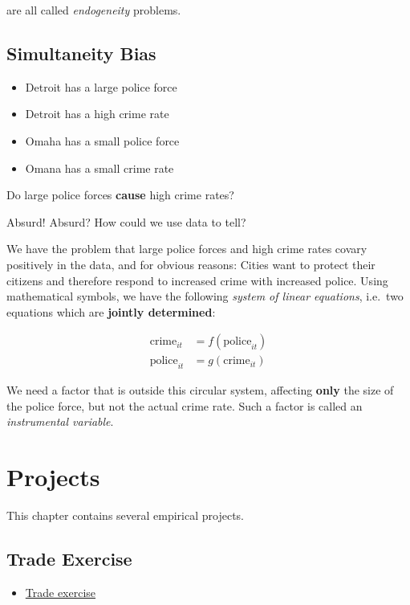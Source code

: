 \documentclass[]{book}
\providecommand{\tightlist}{%
  \setlength{\itemsep}{0pt}\setlength{\parskip}{0pt}}
\begin{document}
are all called \emph{endogeneity} problems.

\hypertarget{simultaneity-bias}{%
\section{Simultaneity Bias}\label{simultaneity-bias}}

\begin{itemize}
\tightlist
\item
  Detroit has a large police force
\item
  Detroit has a high crime rate
\item
  Omaha has a small police force
\item
  Omana has a small crime rate
\end{itemize}

Do large police forces \textbf{cause} high crime rates?

Absurd! Absurd? How could we use data to tell?

We have the problem that large police forces and high crime rates covary positively in the data, and for obvious reasons: Cities want to protect their citizens and therefore respond to increased crime with increased police. Using mathematical symbols, we have the following \emph{system of linear equations}, i.e.~two equations which are \textbf{jointly determined}:

\begin{align*}
\text{crime}_{it} &= f(\text{police}_{it}) \\
\text{police}_{it}&= g(\text{crime}_{it} )
\end{align*}

We need a factor that is outside this circular system, affecting \textbf{only} the size of the police force, but not the actual crime rate. Such a factor is called an \emph{instrumental variable}.

\hypertarget{projects}{%
\chapter{Projects}\label{projects}}

This chapter contains several empirical projects.

\hypertarget{trade-exercise}{%
\section{Trade Exercise}\label{trade-exercise}}

\begin{itemize}
\tightlist
\item
  \href{images/trade.html}{Trade exercise}
\end{itemize}


\end{document}
